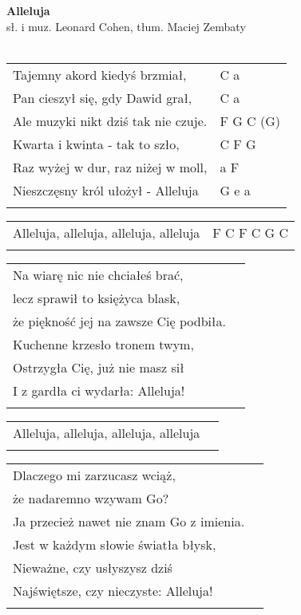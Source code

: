 \documentclass[a5paper]{article}
\begin{document}


\noindent
\fontsize{12pt}{15pt}\selectfont
\textbf{Alleluja} \\
\fontsize{8pt}{10pt}\selectfont
sł. i muz. Leonard Cohen, tłum. Maciej Zembaty \\ \\
\fontsize{10pt}{12pt}\selectfont
{}
\begin{tabular}{@{}p{8.5cm}p{3cm}@{}}
\noindent
Tajemny akord kiedyś brzmiał, & C a \\
Pan cieszył się, gdy Dawid grał, & C a\\
Ale muzyki nikt dziś tak nie czuje. & F G C (G) \\
Kwarta i kwinta - tak to szło, & C F G\\
Raz wyżej w dur, raz niżej w moll, & a F \\
Nieszczęsny król ułożył - Alleluja & G e a\\ \\
\end{tabular}

\noindent
\begin{tabular}{@{}p{7.5cm}p{3cm}@{}}
Alleluja, alleluja, alleluja, alleluja & F C F C G C\\\\
\end{tabular}

\noindent
\begin{tabular}{@{}p{8.5cm}p{3cm}@{}}
Na wiarę nic nie chciałeś brać,\\
lecz sprawił to księżyca blask,\\
że piękność jej na zawsze Cię podbiła.\\
Kuchenne krzesło tronem twym,\\
Ostrzygła Cię, już nie masz sił\\
I z gardła ci wydarła: Alleluja!\\\\
\end{tabular}

\noindent
\begin{tabular}{@{}p{8.5cm}p{3cm}@{}}
Alleluja, alleluja, alleluja, alleluja\\\\
\end{tabular}

\noindent
\begin{tabular}{@{}p{8.5cm}p{3cm}@{}}
Dlaczego mi zarzucasz wciąż,\\
że nadaremno wzywam Go?\\
Ja przecież nawet nie znam Go z imienia.\\
Jest w każdym słowie światła błysk,\\
Nieważne, czy usłyszysz dziś\\
Najświętsze, czy nieczyste: Alleluja!\\\\
\end{tabular}
\end{document}

